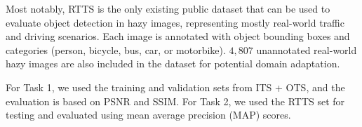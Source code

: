 \documentclass[10pt,twocolumn,letterpaper]{article}
\begin{document}
Most notably, RTTS is the only existing public dataset that can be used to evaluate object detection in hazy images, representing mostly real-world traffic and driving scenarios. Each image is annotated with object bounding boxes and categories (person, bicycle, bus, car, or motorbike). $4,807$ unannotated real-world hazy images are also included in the dataset for potential domain adaptation.
 
For Task 1, we used the training and validation sets from ITS + OTS, and the evaluation is based on PSNR and SSIM. For Task 2, we used the RTTS set for testing and evaluated using mean average precision (MAP) scores.


 
\end{document}
